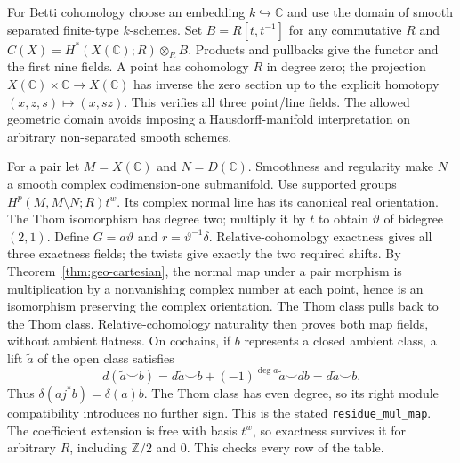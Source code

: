 \documentclass[11pt]{article}
\newcommand{\Z}{\mathbb Z}
\newcommand{\planned}[1]{\texttt{\detokenize{#1}}}
\theoremstyle{definition}
\theoremstyle{remark}
\renewcommand{\planned}[1]{\nolinkurl{#1}}
\begin{document}
For Betti cohomology choose an embedding $k\hookrightarrow\mathbb C$ and use the domain of smooth separated finite-type $k$-schemes. Set $B=R[t,t^{-1}]$ for any commutative $R$ and $C(X)=H^*(X(\mathbb C);R)\otimes_R B$. Products and pullbacks give the functor and the first nine fields. A point has cohomology $R$ in degree zero; the projection $X(\mathbb C)\times\mathbb C\to X(\mathbb C)$ has inverse the zero section up to the explicit homotopy $(x,z,s)\mapsto(x,sz)$. This verifies all three point/line fields. The allowed geometric domain avoids imposing a Hausdorff-manifold interpretation on arbitrary non-separated smooth schemes.

For a pair let $M=X(\mathbb C)$ and $N=D(\mathbb C)$. Smoothness and regularity make $N$ a smooth complex codimension-one submanifold. Use supported groups $H^p(M,M\setminus N;R)t^w$. Its complex normal line has its canonical real orientation. The Thom isomorphism has degree two; multiply it by $t$ to obtain $\vartheta$ of bidegree $(2,1)$. Define $G=a\vartheta$ and $r=\vartheta^{-1}\delta$. Relative-cohomology exactness gives all three exactness fields; the twists give exactly the two required shifts. By Theorem~\ref{thm:geo-cartesian}, the normal map under a pair morphism is multiplication by a nonvanishing complex number at each point, hence is an isomorphism preserving the complex orientation. The Thom class pulls back to the Thom class. Relative-cohomology naturality then proves both map fields, without ambient flatness. On cochains, if $b$ represents a closed ambient class, a lift $\widetilde a$ of the open class satisfies
\[
 d(\widetilde a\smile b)=d\widetilde a\smile b
       +(-1)^{\deg a}\widetilde a\smile db
       =d\widetilde a\smile b.
\]
Thus $\delta(aj^*b)=\delta(a)b$. The Thom class has even degree, so its right module compatibility introduces no further sign. This is the stated \planned{residue_mul_map}. The coefficient extension is free with basis $t^w$, so exactness survives it for arbitrary $R$, including $\Z/2$ and $0$. This checks every row of the table.
\end{document}
